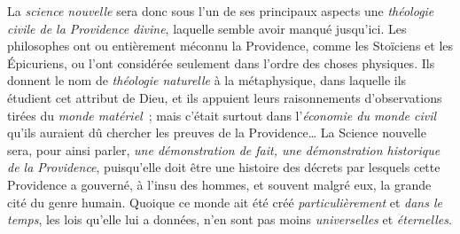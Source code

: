 \documentclass[french,twoside]{book} %
\begin{document}
La {\itshape science nouvelle} sera donc sous l’un de ses principaux aspects une {\itshape théologie civile de la Providence divine}, laquelle semble avoir manqué jusqu’ici. Les philosophes ont ou entièrement méconnu la Providence, comme les Stoïciens et les Épicuriens, ou l’ont considérée seulement dans l’ordre des choses physiques. Ils donnent le nom de {\itshape théologie naturelle} à la métaphysique, dans laquelle ils étudient cet attribut de Dieu, et ils appuient leurs raisonnements d’observations tirées du {\itshape monde matériel} ; mais c’était surtout dans l’{\itshape économie du monde civil} qu’ils auraient dû chercher les preuves de la Providence… La Science nouvelle sera, pour ainsi parler, {\itshape une démonstration de fait, une démonstration historique de la Providence}, puisqu’elle doit être une histoire des décrets par  lesquels cette Providence a gouverné, à l’insu des hommes, et souvent malgré eux, la grande cité du genre humain. Quoique ce monde ait été créé {\itshape particulièrement} et {\itshape dans le temps}, les lois qu’elle lui a données, n’en sont pas moins {\itshape universelles} et {\itshape éternelles}.\par
\end{document}
